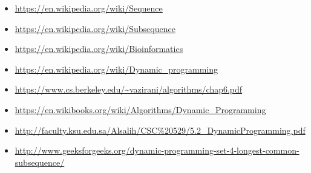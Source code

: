 \documentclass{article}
\begin{document}
		\begin{itemize}
			\item \url{https://en.wikipedia.org/wiki/Sequence}
			\item \url{https://en.wikipedia.org/wiki/Subsequence}
			\item \url{https://en.wikipedia.org/wiki/Bioinformatics}
			\item \url{https://en.wikipedia.org/wiki/Dynamic_programming}
			\item \url{https://www.cs.berkeley.edu/~vazirani/algorithms/chap6.pdf}
			\item \url{https://en.wikibooks.org/wiki/Algorithms/Dynamic_Programming}
			\item \url{http://faculty.ksu.edu.sa/Alsalih/CSC%20529/5.2_DynamicProgramming.pdf}
			\item \url{http://www.geeksforgeeks.org/dynamic-programming-set-4-longest-common-subsequence/}

		\end{itemize}
\end{document}
